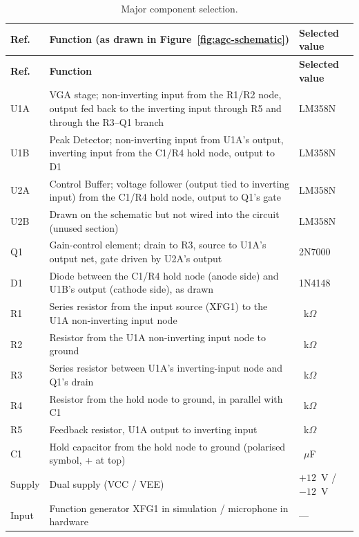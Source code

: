 \Needspace{6cm}
{\footnotesize
\renewcommand{\arraystretch}{1.05}
\begin{longtable}{@{}>{\raggedright\arraybackslash}p{1.6cm}>{\raggedright\arraybackslash}p{8.0cm}>{\raggedright\arraybackslash}p{4.4cm}@{}}
\caption{Major component selection.}\label{tab:component-values}\\
\toprule
\textbf{Ref.} & \textbf{Function (as drawn in Figure~\ref{fig:agc-schematic})} & \textbf{Selected value} \\
\midrule
\endfirsthead
\toprule
\textbf{Ref.} & \textbf{Function} & \textbf{Selected value} \\
\midrule
\endhead
\bottomrule
\endfoot
\bottomrule
\endlastfoot
U1A & VGA stage; non-inverting input from the R1/R2 node, output fed back to the inverting input through R5 and through the R3--Q1 branch & LM358N \\
U1B & Peak Detector; non-inverting input from U1A's output, inverting input from the C1/R4 hold node, output to D1 & LM358N \\
U2A & Control Buffer; voltage follower (output tied to inverting input) from the C1/R4 hold node, output to Q1's gate & LM358N \\
U2B & Drawn on the schematic but not wired into the circuit (unused section) & LM358N \\
Q1 & Gain-control element; drain to R3, source to U1A's output net, gate driven by U2A's output & 2N7000 \\
D1 & Diode between the C1/R4 hold node (anode side) and U1B's output (cathode side), as drawn & 1N4148 \\
R1 & Series resistor from the input source (XFG1) to the U1A non-inverting input node & 8.2~k$\Omega$ \\
R2 & Resistor from the U1A non-inverting input node to ground & 8.2~k$\Omega$ \\
R3 & Series resistor between U1A's inverting-input node and Q1's drain & 8.2~k$\Omega$ \\
R4 & Resistor from the hold node to ground, in parallel with C1 & 47~k$\Omega$ \\
R5 & Feedback resistor, U1A output to inverting input & 10~k$\Omega$ \\
C1 & Hold capacitor from the hold node to ground (polarised symbol, + at top) & 1~$\mu$F \\
Supply & Dual supply (VCC / VEE) & $+12$~V / $-12$~V \\
Input & Function generator XFG1 in simulation / microphone in hardware & --- \\
\end{longtable}
}

\noindent{}
